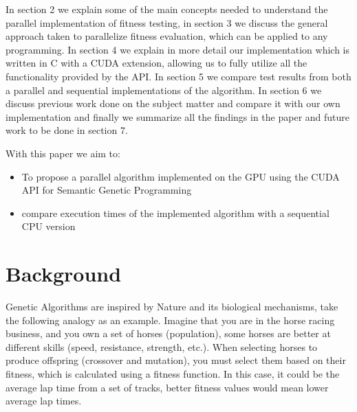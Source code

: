 \documentclass[runningheads]{llncs}
\begin{document}
In section 2 we explain some of the main concepts needed to understand the parallel implementation of fitness testing, in section 3 we discuss the general approach taken to parallelize fitness evaluation, which can be applied to any programming. In section 4 we explain in more detail our implementation which is written in C with a CUDA extension, allowing us to fully utilize all the functionality provided by the API. In section 5 we compare test results from both a parallel and sequential implementations of the algorithm. In section 6 we discuss previous work done on the subject matter and compare it with our own implementation and finally we summarize all the findings in the paper and future work to be done in section 7.

With this paper we aim to:
\begin{itemize}
	\item To propose a parallel algorithm implemented on the GPU using the CUDA API for Semantic Genetic Programming
	\item compare execution times of the implemented algorithm with a sequential CPU version
\end{itemize}


\section{Background}

Genetic Algorithms are inspired by Nature and its biological mechanisms, take the following analogy as an example. Imagine that you are in the horse racing business, and you own a set of horses (population), some horses are better at different skills (speed, resistance, strength, etc.). When selecting horses to produce offspring (crossover and mutation), you must select them based on their fitness, which is calculated using a fitness function. In this case, it could be the average lap time from a set of tracks, better fitness values would mean lower average lap times.
\end{document}
